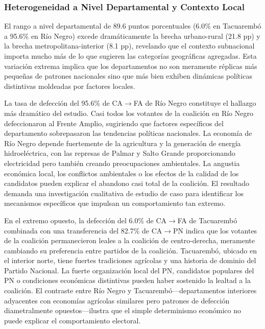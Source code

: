 \subsubsection{Heterogeneidad a Nivel Departamental y Contexto Local}

El rango a nivel departamental de 89.6 puntos porcentuales (6.0\% en Tacuarembó a 95.6\% en Río Negro) excede dramáticamente la brecha urbano-rural (21.8 pp) y la brecha metropolitana-interior (8.1 pp), revelando que el contexto subnacional importa mucho más de lo que sugieren las categorías geográficas agregadas. Esta variación extrema implica que los departamentos no son meramente réplicas más pequeñas de patrones nacionales sino que más bien exhiben dinámicas políticas distintivas moldeadas por factores locales.

La tasa de defección del 95.6\% de CA$\to$FA de Río Negro constituye el hallazgo más dramático del estudio. Casi todos los votantes de la coalición en Río Negro defeccionaron al Frente Amplio, sugiriendo que factores específicos del departamento sobrepasaron las tendencias políticas nacionales. La economía de Río Negro depende fuertemente de la agricultura y la generación de energía hidroeléctrica, con las represas de Palmar y Salto Grande proporcionando electricidad pero también creando preocupaciones ambientales. La angustia económica local, los conflictos ambientales o los efectos de la calidad de los candidatos pueden explicar el abandono casi total de la coalición. El resultado demanda una investigación cualitativa de estudio de caso para identificar los mecanismos específicos que impulsan un comportamiento tan extremo.

En el extremo opuesto, la defección del 6.0\% de CA$\to$FA de Tacuarembó combinada con una transferencia del 82.7\% de CA$\to$PN indica que los votantes de la coalición permanecieron leales a la coalición de centro-derecha, meramente cambiando su preferencia entre partidos de la coalición. Tacuarembó, ubicado en el interior norte, tiene fuertes tradiciones agrícolas y una historia de dominio del Partido Nacional. La fuerte organización local del PN, candidatos populares del PN o condiciones económicas distintivas pueden haber sostenido la lealtad a la coalición. El contraste entre Río Negro y Tacuarembó---departamentos interiores adyacentes con economías agrícolas similares pero patrones de defección diametralmente opuestos---ilustra que el simple determinismo económico no puede explicar el comportamiento electoral.

